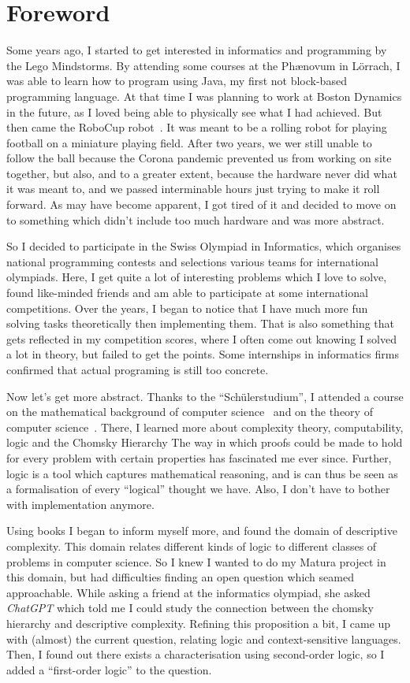 \chapter*{Foreword}

Some years ago, I started to get interested in informatics and programming by the Lego Mindstorms.
By attending some courses at the Ph\ae novum in Lörrach, I was able to learn how to program using Java, my first not block-based programming language.
At that time I was planning to work at Boston Dynamics in the future, as I loved being able to physically see what I had achieved.
But then came the RoboCup robot~\cite{roboCup}.
It was meant to be a rolling robot for playing football on a miniature playing field.
After two years, we wer still unable to follow the ball because the Corona pandemic prevented us from working on site together, but also, and to a greater extent, because the hardware never did what it was meant to, and we passed interminable hours just trying to make it roll forward.
As may have become apparent, I got tired of it and decided to move on to something which didn't include too much hardware and was more abstract.

So I decided to participate in the Swiss Olympiad in Informatics, which organises national programming contests and selections various teams for international olympiads.
Here, I get quite a lot of interesting problems which I love to solve, found like-minded friends and am able to participate at some international competitions.
Over the years, I began to notice that I have much more fun solving tasks theoretically then implementing them.
That is also something that gets reflected in my competition scores, where I often come out knowing I solved a lot in theory, but failed to get the points.
Some internships in informatics firms confirmed that actual programing is still too concrete.

Now let's get more abstract.
Thanks to the ``Schülerstudium'', I attended a course on the mathematical background of computer science~\cite{discrete-maths} and on the theory of computer science~\cite{theory-cs}.
There, I learned more about complexity theory, computability, logic and the Chomsky Hierarchy
The way in which proofs could be made to hold for every problem with certain properties has fascinated me ever since.
Further, logic is a tool which captures mathematical reasoning, and is can thus be seen as a formalisation of every ``logical'' thought we have.
Also, I don't have to bother with implementation anymore.

Using books I began to inform myself more, and found the domain of descriptive complexity.
This domain relates different kinds of logic to different classes of problems in computer science.
So I knew I wanted to do my Matura project in this domain, but had difficulties finding an open question which seamed approachable.
While asking a friend at the informatics olympiad, she asked \emph{ChatGPT} which told me I could study the connection between the chomsky hierarchy and descriptive complexity.
Refining this proposition a bit, I came up with (almost) the current question, relating logic and context-sensitive languages.
Then, I found out there exists a characterisation using second-order logic, so I added a ``first-order logic'' to the question.
